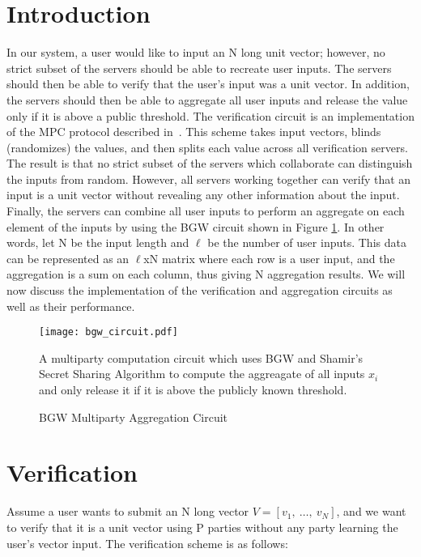 \documentclass[conference]{IEEEtran}
\begin{document}
\IEEEpeerreviewmaketitle

\section{Introduction}
In our system, a user would like to input an N long unit vector; however, no strict subset of the servers should be able to recreate user inputs. The servers should then be able to verify that the user's input was a unit vector. In addition, the servers should then be able to aggregate all user inputs and release the value only if it is above a public threshold. The verification circuit is an implementation of the MPC protocol described in~\cite{Boyle:2016:FSS:2976749.2978429}. This scheme takes input vectors, blinds (randomizes) the values, and then splits each value across all verification servers. The result is that no strict subset of the servers which collaborate can distinguish the inputs from random. However, all servers working together can verify that an input is a unit vector without revealing any other information about the input. Finally, the servers can combine all user inputs to perform an aggregate on each element of the inputs by using the BGW circuit shown in Figure \ref{fig:bgw_circuit}. In other words, let N be the input length and $\ell$ be the number of user inputs. This data can be represented as an $\ell$xN matrix where each row is a user input, and the aggregation is a sum on each column, thus giving N aggregation results. We will now discuss the implementation of the verification and aggregation circuits as well as their performance.


\begin{figure}
\texttt{[image: bgw\_circuit.pdf]}\\
\caption{BGW Multiparty Aggregation Circuit}
\label{fig:bgw_circuit}
\medskip
\small
A multiparty computation circuit which uses BGW and Shamir's Secret Sharing Algorithm to compute the aggreagate of all inputs $x_i$ and only release it if it is above the publicly known threshold.
\end{figure}

\section{Verification}
Assume a user wants to submit an N long vector $\textit{V} = [v_1,~\dots,~v_N]$, and we want to verify that it is a unit vector using P parties without any party learning the user's vector input. The verification scheme is as follows:\\
\end{document}
